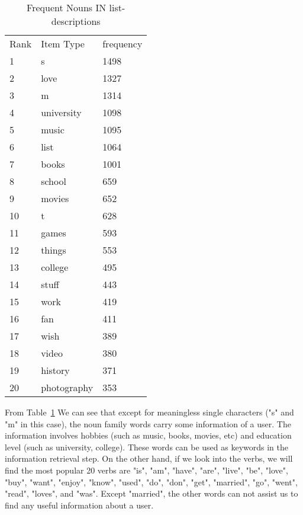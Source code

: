 \begin{table}[!ht]
\centering
\caption{Frequent Nouns IN list-descriptions}
\label{tb:freq}
\begin{tabular}{lll}
 Rank & Item Type & frequency\\
 1 & s & 1498   \\
 2 & love & 1327   \\
 3 & m & 1314   \\
 4 & university & 1098   \\
 5 & music & 1095   \\
 6 & list & 1064   \\
 7 & books & 1001   \\
 8 & school & 659   \\
 9 & movies & 652   \\
 10 & t & 628  \\
 11 & games & 593  \\
 12 & things & 553   \\
 13 & college & 495  \\
 14 & stuff & 443  \\
 15 & work & 419   \\
 16 & fan & 411  \\
 17 & wish & 389  \\
 18 & video & 380  \\
 19 & history & 371  \\
 20 & photography & 353  \\
\end{tabular}
\end{table}

From Table~\ref{tb:freq} We can see that except for meaningless single characters ("s" and "m" in this case), the noun family words carry some information of a user. The information involves hobbies (such as music, books, movies, etc) and education level (such as university, college). These words can be used as keywords in the information retrieval step. On the other hand, if we look into the verbs, we will find the most popular 20 verbs are "is",  "am",  "have",  "are",  "live",  "be",  "love",  "buy",  "want",  "enjoy",  "know",  "used",  "do",  "don",  "get",  "married",  "go",  "went",  "read",  "loves",  and "was". Except "married", the other words can not assist us to find any useful information about a user.
